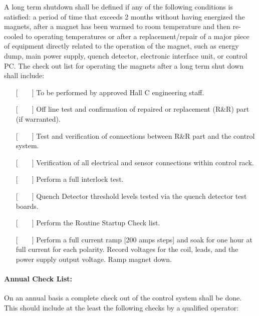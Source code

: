 A long term shutdown shall be defined if any of the following
conditions is satisfied: a period of time that exceeds 2 months without
having energized the magnets, after a magnet has been warmed to room
temperature and then re-cooled to operating temperatures or after a
replacement/repair of a major piece of equipment directly related to the
operation of the magnet, such as energy dump, main power supply, quench
detector, electronic interface unit, or control PC.  The check out list for
operating the magnets after a long term shut down shall include:

\begin{itemize}
\item[{[~~~~]}] {To be performed by approved Hall C engineering staff.}
\item[{[~~~~]}] {Off line test and confirmation of repaired or
replacement (R\&R) part (if warranted).}
\item[{[~~~~]}] {Test and verification of connections between R\&R
part and the control system.}
\item[{[~~~~]}] {Verification of all electrical and sensor
connections within control rack.}
\item[{[~~~~]}] {Perform a full interlock test.}
\item[{[~~~~]}] {Quench Detector threshold levels tested via the
quench detector test boards.}
\item[{[~~~~]}] {Perform the Routine Startup Check list.}
\item[{[~~~~]}] {Perform a full current ramp [200 amps steps] and
soak for one hour
at full current for each polarity. Record voltages for the coil, leads, and
the power supply output voltage. Ramp magnet down.}
\end{itemize}

\vspace{0.5in}
\hspace*{3.5in}{\underline{~~~~~~~~~~~~~~~~~~~~~~~~~~~~~~~~~}}
\newline
\hspace*{3.5in}{Signature~~~~~~~~~~~~Date}

\newpage
\paragraph{Annual Check List:}

On an annual basis a complete check out of the control system
shall be done. This should include at the least the following checks by a
qualified operator:

